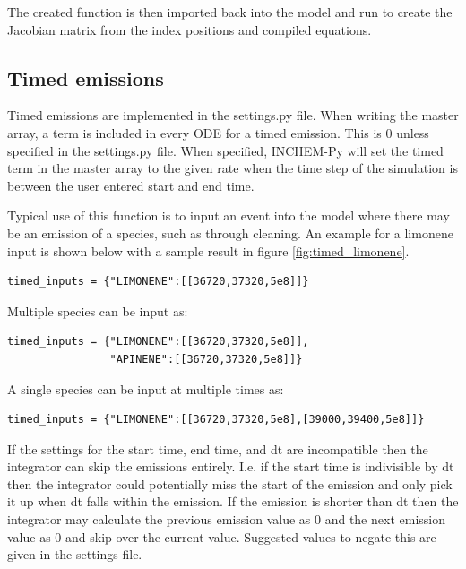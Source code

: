 \documentclass[a4paper]{refart}
\begin{document}
The created function is then imported back into the model and run to create the Jacobian matrix from the index positions and compiled equations.

\subsection{Timed emissions}\label{timed emissions, implementation}
Timed emissions are implemented in the settings.py file.  When writing the master array, a term is included in every ODE for a timed emission. This is 0 unless specified in the settings.py file. When specified, INCHEM-Py will set the timed term in the master array to the given rate when the time step of the simulation is between the user entered start and end time. 

Typical use of this function is to input an event into the model where there may be an emission of a species, such as through cleaning. An example for a limonene input is shown below with a sample result in figure \ref{fig:timed_limonene}. 

\begin{verbatim}
timed_inputs = {"LIMONENE":[[36720,37320,5e8]]}    
\end{verbatim}

Multiple species can be input as:
\begin{verbatim}
timed_inputs = {"LIMONENE":[[36720,37320,5e8]],
                "APINENE":[[36720,37320,5e8]]}
\end{verbatim}

A single species can be input at multiple times as:
\begin{verbatim}
timed_inputs = {"LIMONENE":[[36720,37320,5e8],[39000,39400,5e8]]} 
\end{verbatim}

If the settings for the start time, end time, and dt are incompatible then the integrator can skip the emissions entirely. I.e. if the start time is indivisible by dt then the integrator could potentially miss the start of the emission and only pick it up when dt falls within the emission. If the emission is shorter than dt then the integrator may calculate the previous emission value as 0 and the next emission value as 0 and skip over the current value. Suggested values to negate this are given in the settings file.
\end{document}
